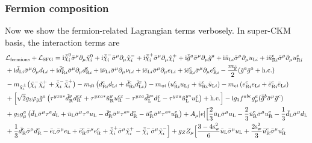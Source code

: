 \documentclass[CheatSheet]{subfiles}
\begin{document}
\subsubsection{Fermion composition}
Now we show the fermion-related Lagrangian terms verbosely. In super-CKM basis, the interaction terms are
\begin{equation}
  \begin{split}
&  \mathcal L\w{fermions} + \mathcal L\w{SFG}
=
   {\ii} \bneut[i]\bsigma^{\mu }\partial_{\mu}\neut[i]
 + {\ii} \bcharM[i]\bsigma^{\mu }\partial_{\mu}\charM[i]
 + {\ii} \bcharP[i]\bsigma^{\mu }\partial_{\mu}\charP[i]
 + {\ii} \bar{\tig}^{a}\bsigma^{\mu }\partial_{\mu}\tig^{a}
 + {\ii} \buL[i]\bsigma^{\mu}\partial_{\mu}\uL[i]
 + {\ii} \buR[i]^{\cc}\bsigma^{\mu }\partial_{\mu}\uR[i]^{\cc}
\\&
 + {\ii} \bdL[i]\bsigma^{\mu}\partial_{\mu}\dL[i]
 + {\ii} \bdR[i]^{\cc}\bsigma^{\mu }\partial_{\mu}\dR[i]^{\cc}
 + {\ii} \bnuL[i]\bsigma^{\mu }\partial_{\mu}\nuL[i]
 + {\ii} \beL[i]\bsigma^{\mu }\partial_{\mu}\eL[i]
 + {\ii} \beR[i]^{\cc}\bsigma^{\mu }\partial_{\mu}\eR[i]^{\cc}
 - \frac{m_{\tilde g}}{2} (\tig^{a}\tig^{a}+\text{h.c.})
\\&
 - m_{\charPM[i]}\bigl(\charM[i]\charP[i] + \bcharM[i]\bcharP[i]\bigr)
 - m_{di}\left(\dR[i]^{\cc}\dL[i] + \bdR[i]^{\cc}\bdL[i]^{x}\right)
 - m_{ui}\left(\uR[i]^{\cc}\uL[j]+\buR[i]^{\cc}\buL[i]\right)
 - m_{ei}\left(\eR[i]^{\cc}\eL[i] + \beR[i]^{\cc}\beL[i]\right)
%
%
\\&+\Bigl[
\sqrt{2} g_3 \varphi_{\tilde g}\tig^{a}\left(
  \tau^{yxa*}\tdR^{y}\dR^{\cc x}
 +\tau^{yxa*}\tuR^{y}\uR^{\cc x}
 -\tau^{yxa}\tdL^{y*}\dL^{x}
 -\tau^{yxa}\tuL^{y*}\uL^{x}
\right)+\text{h.c.}\Bigr]
-\ii g_3 f^{abc}g_\mu^a (\bar{\tig}^{b}\bsigma^{\mu }\tig^{c})
\\&
+
g_3g_\mu^a\left(
 \bdL\bsigma^{\mu }\tau^a\dL
+\buL\bsigma^{\mu }\tau^a\uL
-\bdR^{\cc}\bsigma^{\mu }\tau^{a*}\dR^{\cc}
-\buR^{\cc}\bsigma^{\mu }\tau^{a*}\uR^{\cc}
\right)
+
A_\mu|e|\Bigl[
   \frac{2}{3} {\buL\bsigma^{\mu }\uL}
  -\frac{2}{3} {\buR^{\cc}\bsigma^{\mu }\uR^{\cc}}
  -\frac{1}{3} {\bdL\bsigma^{\mu }\dL}
\\&
  +\frac13 \bdR^{\cc}\bsigma^{\mu }\dR^{\cc}
  - {\beL\bsigma^{\mu }\eL}
  +{\beR^{\cc }\bsigma^{\mu }\eR^{\cc }}
  + \bcharP[i]\bsigma^{\mu}\charP[i]
  -\bcharM[i]\bsigma^{\mu}\charM[i]
\Bigr]
%
+g_Z Z_\mu\Bigl[
  \frac{3-4\sw^2}{6} {\buL\bsigma^{\mu }\uL}
  +\frac{2\sw^2}{3} {\buR^{\cc}\bsigma^{\mu }\uR^{\cc}}
  \\&

\end{split}
\end{equation}
\end{document}
